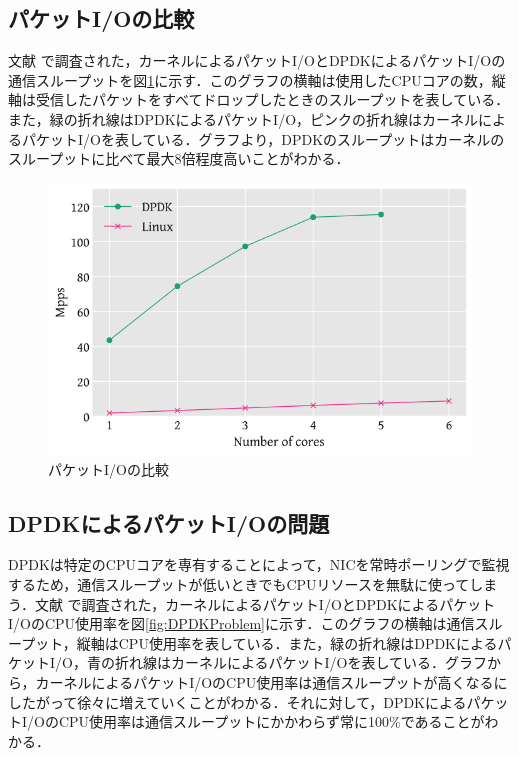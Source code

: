 \subsection{パケットI/Oの比較}
文献 \cite{XDP} で調査された，カーネルによるパケットI/OとDPDKによるパケットI/Oの通信スループットを図\ref{fig:PacketIOComparison}に示す．このグラフの横軸は使用したCPUコアの数，縦軸は受信したパケットをすべてドロップしたときのスループットを表している．また，緑の折れ線はDPDKによるパケットI/O，ピンクの折れ線はカーネルによるパケットI/Oを表している．グラフより，DPDKのスループットはカーネルのスループットに比べて最大8倍程度高いことがわかる．

\begin{figure}[htb]
  \centering
  \includegraphics[width=\columnwidth]{pictures/PacketIOComparison.png}
  \caption{パケットI/Oの比較}
  \label{fig:PacketIOComparison}
\end{figure}

\subsection{DPDKによるパケットI/Oの問題}
DPDKは特定のCPUコアを専有することによって，NICを常時ポーリングで監視するため，通信スループットが低いときでもCPUリソースを無駄に使ってしまう．文献 \cite{XDP} で調査された，カーネルによるパケットI/OとDPDKによるパケットI/OのCPU使用率を図\ref{fig:DPDKProblem}に示す．このグラフの横軸は通信スループット，縦軸はCPU使用率を表している．また，緑の折れ線はDPDKによるパケットI/O，青の折れ線はカーネルによるパケットI/Oを表している．グラフから，カーネルによるパケットI/OのCPU使用率は通信スループットが高くなるにしたがって徐々に増えていくことがわかる．それに対して，DPDKによるパケットI/OのCPU使用率は通信スループットにかかわらず常に100\%であることがわかる．

